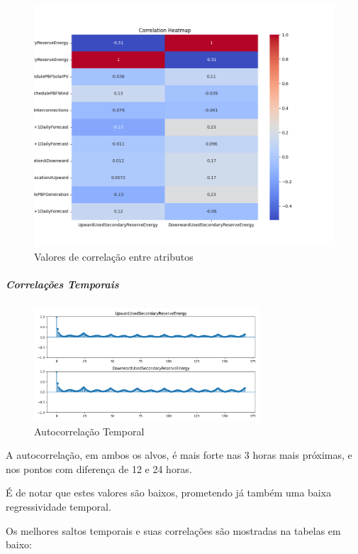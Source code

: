 \begin{figure}[H]
  \centering
  \includegraphics[width=\textwidth]{plots/correlation_heatmap.png}
  \caption{Valores de correlação entre atributos}
  \label{fig:correlationheatmap}
\end{figure}

\subparagraph{Correlações Temporais}
\text{ }  \par

\begin{figure}[H]
  \centering
  \includegraphics[width=0.75\textwidth]{plots/autocorrelation.png}
  \caption{Autocorrelação Temporal}
  \label{fig:autocorrelation}
\end{figure}

A autocorrelação, em ambos os alvos, é mais forte nas 3 horas mais próximas, e nos pontos com diferença de 12 e 24 horas.\par
É de notar que estes valores são baixos, prometendo já também uma baixa regressividade temporal.\par
Os melhores saltos temporais e suas correlações são mostradas na tabelas em baixo:\\


